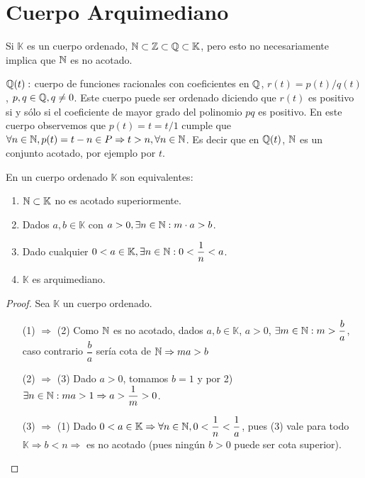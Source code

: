 \section{Cuerpo Arquimediano}

Si \(\mathbb{K} \) es un cuerpo ordenado, \(\mathbb{N} \subset \mathbb{Z} \subset \mathbb{Q} \subset \mathbb{K} \), pero esto no necesariamente implica que \(\mathbb{N} \) es no acotado.

\begin{eg}
    \(\mathbb{Q}(t):\) cuerpo de funciones racionales con coeficientes en \(\mathbb{Q} \), \(r(t) = p(t)/q(t)\), \(p, q \in \mathbb{Q}, q \neq 0\). Este cuerpo puede ser ordenado diciendo que \(r(t)\) es positivo si y sólo si el coeficiente de mayor grado del polinomio \(pq\) es positivo.
    En este cuerpo observemos que \(p(t)=t=t/1\) cumple que \(\forall n \in \mathbb{N}, p(t)=t-n \in P \Rightarrow t>n, \forall n \in \mathbb{N} \). Es decir que en \(\mathbb{Q}(t)\), \(\mathbb{N} \) es un conjunto acotado, por ejemplo por \(t\).
\end{eg}

\begin{theorem}
    En un cuerpo ordenado \(\mathbb{K} \) son equivalentes: \begin{enumerate}
        \item \(\mathbb{N} \subset \mathbb{K} \) no es acotado superiormente.
        \item Dados \(a, b \in \mathbb{K} \) con \(a>0, \exists n \in \mathbb{N}:m \cdot a>b\).
        \item Dado cualquier \(0<a \in \mathbb{K}, \exists n \in \mathbb{N} : 0 < \dfrac{1}{n} < a\).
        \item \(\mathbb{K} \) es arquimediano.
    \end{enumerate}
    \begin{proof}
        Sea \(\mathbb{K} \) un cuerpo ordenado.\begin{enumerate}
            \item[(1) \(\Rightarrow \) (2)] Como \(\mathbb{N} \) es no acotado, dados \(a,b \in \mathbb{K} \), \(a>0\), \(\exists m \in \mathbb{N} : m > \dfrac ba\), caso contrario \(\dfrac ba\) sería cota de \(\mathbb{N} \Rightarrow ma>b\)
            \item[(2) \(\Rightarrow \) (3)] Dado \(a>0\), tomamos \(b=1\) y por 2) \(\exists n \in \mathbb{N} : ma > 1 \Rightarrow a > \dfrac{1}{m} > 0\).
            \item[(3) \(\Rightarrow \) (1)] Dado \(0<a \in \mathbb{K} \Rightarrow \forall n \in \mathbb{N}, 0<\dfrac 1n<\dfrac 1a\), pues (3) vale para todo \(\mathbb{K} \Rightarrow b<n \Rightarrow \) es no acotado (pues ningún \(b>0\) puede ser cota superior).
        \end{enumerate}
    \end{proof}
\end{theorem}


